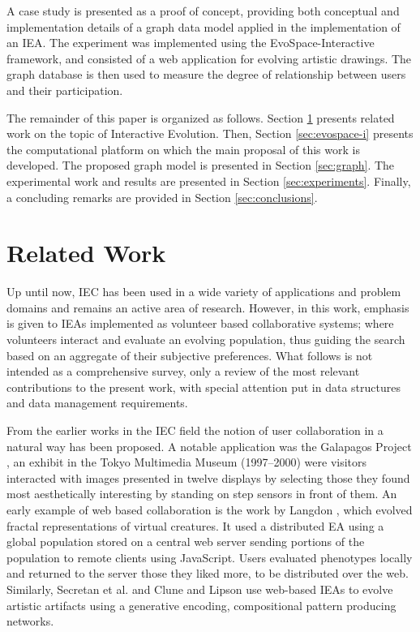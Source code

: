 \documentclass[conference]{IEEEtran}
\begin{document}
A case study is presented as a proof of concept, providing both
conceptual and implementation details of a graph data model applied in the 
implementation of an IEA. The experiment was implemented using
the EvoSpace-Interactive framework, and consisted of a web application
for evolving artistic drawings. The graph database is then used to
measure the degree of relationship between users and their participation.  

The remainder of this paper is organized as follows.
Section \ref{sec:interactive} presents related work on the topic 
of Interactive Evolution.
Then, Section \ref{sec:evospace-i} presents the computational platform on which 
the main proposal of this work is developed. The proposed graph model is 
presented in Section \ref{sec:graph}.
The experimental work and results are presented in Section \ref{sec:experiments}.
Finally, a concluding remarks are provided in Section \ref{sec:conclusions}.


\section{Related Work}
\label{sec:interactive}

Up until now, IEC  has been used in a wide variety of applications and problem domains
and remains an active area of research. However, in this work, emphasis is given to IEAs 
implemented as volunteer based collaborative systems; where volunteers interact and evaluate 
an evolving population, thus guiding the search based on an aggregate of their subjective 
preferences. What follows is not intended as a comprehensive survey, only a review of 
the most relevant contributions to the present work, with special attention put in
data structures and data management requirements.

From the earlier works in the IEC field the notion of user collaboration in a natural way
has been proposed. A notable application was the Galapagos Project \cite{sims1997interactivity},
an exhibit in the Tokyo Multimedia Museum (1997--2000) were visitors interacted with images presented in 
twelve displays by selecting those they found most aesthetically interesting by standing on
step sensors in front of them. An early example of web based collaboration is the work by 
Langdon \cite{langdon:2004}, which evolved fractal representations of virtual creatures. It used a 
distributed EA using a global population stored on a central web server sending 
portions of the population to remote clients using JavaScript. Users evaluated phenotypes locally 
and returned to the server those they liked more, to be distributed over the web.
Similarly, Secretan et al. \cite{picbreeder} and Clune and Lipson \cite{forms} use web-based IEAs 
to evolve artistic artifacts using a generative encoding, compositional pattern producing networks.
\end{document}

